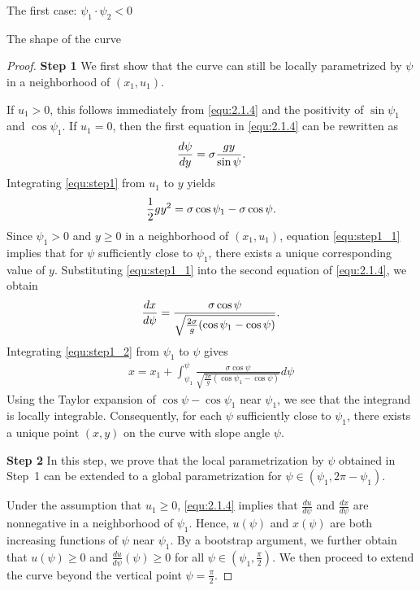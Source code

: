 \documentclass[letterpaper,reqno,10pt,twoside]{amsart}
\theoremstyle{definition}
\theoremstyle{remark}
\begin{document}
\begin{section}{The first case: $\psi_1\cdot \psi_2<0$ }
\begin{subsection}{The shape of the curve}
\begin{proof}
        \textbf{Step 1} We first show that the curve can still be locally parametrized by $\psi$ in a neighborhood of $(x_{1},u_{1})$.

       If $u_{1}>0$, this follows immediately from \eqref{equ:2.1.4} and the positivity of $\sin\psi_{1}$ and $\cos\psi_{1}$. If $u_{1}=0$, then the first equation in \eqref{equ:2.1.4} can be rewritten as
        \begin{equation}{\label{equ:step1}}
            \frac{d\psi}{dy}=\sigma \frac{gy}{\sin\psi}.
        \end{equation}
        \noindent Integrating \eqref{equ:step1} from $u_{1}$ to $y$ yields
        \begin{align}{\label{equ:step1_1}}
            \frac{1}{2}gy^{2}=\sigma\cos\psi_{1}-\sigma \cos\psi .     
        \end{align}
        \noindent Since $\psi_{1}>0$ and $y\ge 0$ in a neighborhood of $(x_{1},u_{1})$, equation \eqref{equ:step1_1} implies that for $\psi$ sufficiently close to $\psi_{1}$, there exists a unique corresponding value of $y$. Substituting \eqref{equ:step1_1} into the second equation of \eqref{equ:2.1.4}, we obtain
        \begin{align}{\label{equ:step1_2}}
            \frac{dx}{d\psi}=\frac{\sigma \cos\psi}{\sqrt{\frac{2\sigma}{g}(\cos\psi_{1}- \cos\psi)}}.
        \end{align}
       Integrating \eqref{equ:step1_2} from $\psi_{1}$ to $\psi$ gives
        \begin{align}
            x=x_{1}+\int_{\psi_{1}}^{\psi}\frac{\sigma \cos\psi}{\sqrt{\frac{2\sigma}{g}(\cos\psi_{1}- \cos\psi)}}d\psi
        \end{align}
        Using the Taylor expansion of $\cos\psi-\cos\psi_{1}$ near $\psi_{1}$, we see that the integrand is locally integrable. Consequently, for each $\psi$ sufficiently close to $\psi_{1}$, there exists a unique point $(x,y)$ on the curve with slope angle $\psi$.
        
        \textbf{Step 2} In this step, we prove that the local parametrization by $\psi$ obtained in Step~1 can be extended to a global parametrization for $\psi \in (\psi_{1}, 2\pi-\psi_{1})$.
        
        Under the assumption that $u_{1}\geq 0$, \eqref{equ:2.1.4} implies that $\frac{du}{d\psi}$ and $\frac{dx}{d\psi}$ are nonnegative in a neighborhood of $\psi_1$. Hence, $u(\psi)$ and $x(\psi)$ are both increasing functions of $\psi$ near $\psi_1$. By a bootstrap argument, we further obtain that $u(\psi)\geq 0$ and $\frac{du}{d\psi}(\psi)\geq 0$ for all $\psi\in(\psi_1,\frac{\pi}{2})$. We then proceed to extend the curve beyond the vertical point $\psi=\frac{\pi}{2}$. 


\end{proof}
\end{subsection}
\end{section}
\end{document}
